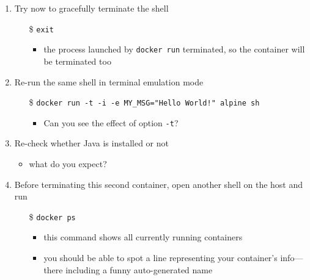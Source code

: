 \documentclass{beamer}\mode<presentation>{\usetheme{AMSBolognaFC}}
\begin{document}
\begin{frame}[allowframebreaks]
\begin{enumerate}
        \framebreak

        \item Try now to gracefully terminate the shell
        \begin{itemize}
            \item[\$] \texttt{exit}
            \begin{itemize}
                \item the process launched by \texttt{docker run} terminated, so the container will be terminated too
            \end{itemize}
        \end{itemize}

        \item Re-run the same shell in terminal emulation mode
        \begin{itemize}
            \item[\$] \texttt{docker run \alert{-t} -i -e MY\_MSG="Hello World!" alpine sh}
            \begin{itemize}
                \item Can you see the effect of option \texttt{-t}?
            \end{itemize}
        \end{itemize}

        \item Re-check whether Java is installed or not
        \begin{itemize}
            \item what do you expect?
        \end{itemize}

        \framebreak

        \item \alert{Before terminating this second container}, open another shell \alert{on the host} and run
        \begin{itemize}
            \item[\$] \texttt{docker \alert{ps}}
            \begin{itemize}
                \item this command shows all \alert{currently} running containers
                \item you should be able to spot a line representing your container's info---there including a funny auto-generated name
            \end{itemize}
        \end{itemize}


\end{enumerate}
\end{frame}
\end{document}
